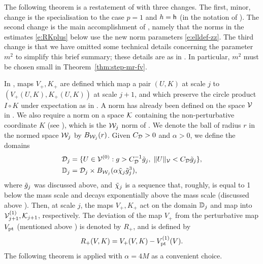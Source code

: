 The following theorem is a restatement of \cite[Theorem~\ref{phi4-thm:step-mr-fv}]{ST-phi4}
with three changes. The first, minor, change is the
specialisation to the case $p = 1$ and $h = {\sf h}$
(in the notation of \cite{ST-phi4}). The second change is the
main accomplishment of \cite{BSTW-clp}, %
namely that the norms in the estimates
\eqref{e:RKplus} below use the new norm parameters \eqref{e:elldef-zz}.
The third change is that we have omitted some technical details
concerning the parameter $m^2$ to simplify this brief summary;
these details are as in \cite[Theorem~\ref{phi4-thm:step-mr-fv}]{ST-phi4}.
In particular, $m^2$ must be chosen small in Theorem~\ref{thm:step-mr-fv}.

In \cite{BS-rg-step}, maps $V_+,K_+$ are defined which map a pair $(U,K)$ at scale $j$
to $(V_+(U,K),K_+(U,K))$ at scale $j+1$, and which preserve the circle product
$I\circ K$ under expectation as in .
A norm has already been defined on the space $\mathcal{V}$ in .
We also require a norm on a space $\mathcal{K}$ containing the non-perturbative
coordinate $K$ (see \cite[Definition~\ref{phi4-def:Kspace}]{ST-phi4}),
which is the $\mathcal{W}_j$ norm of \cite[\eqref{step-e:9Kcalnorm}]{BS-rg-step}.
We denote the ball of radius $r$ in
the normed space $\mathcal{W}_j$ by $B_{\mathcal{W}_j}(r)$.
Given $C_{\mathcal{D}}>0$ and $\alpha>0$, we define the domains
\begin{align}
\label{e:DVdef}
    \mathcal{D}_j &= \{U\in \mathcal{V}^{(0)} :
    g> C_{\mathcal{D}}^{-1} \tilde{g}_j  , \;  \|U\|_{\mathcal{V}} < C_{\mathcal{D}} \tilde{g}_j \},
\\
\mathbb{D}_j &= \mathcal{D}_j \times B_{\mathcal{W}_j}(\alpha \tilde{\chi}_j \tilde{g}_j^3),
\end{align}
where $\tilde{g}_j$ was discussed above,
and $\tilde{\chi}_j$ is a sequence that, roughly, is equal to 1 below the mass scale and decays
exponentially above the mass scale (discussed above \cite[\eqref{step-e:domRGgen}]{BS-rg-step}).
Then, at scale $j$, the maps $V_+,K_+$ act on the domain $\mathbb{D}_j$
and map into $\mathcal{V}_{j+1}^{(1)},\mathcal{K}_{j+1}$, respectively.
The deviation of the map $V_+$ from the perturbative map $V_{\rm pt}$ (mentioned above )
is denoted by $R_+$, and is defined by
\begin{equation}
\label{e:Rplusdef}
    R_+(V,K) = V_+(V,K) -V_{\rm pt}^{(1)}(V).
\end{equation}
The following theorem is applied with $\alpha =4M$ as a convenient choice.


